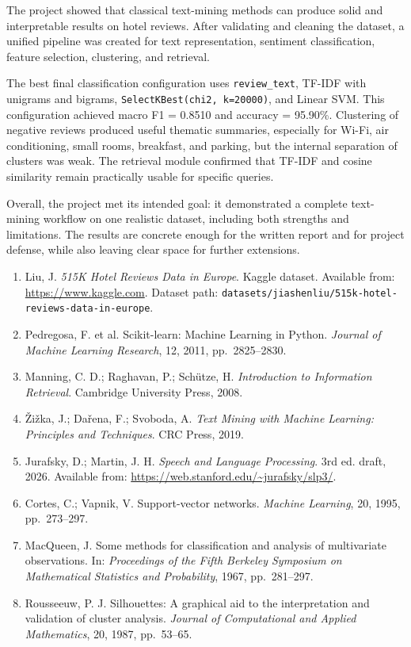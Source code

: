 \documentclass[twoside, 12pt]{article}
\begin{document}
The project showed that classical text-mining methods can produce solid and interpretable results on hotel reviews. After validating and cleaning the dataset, a unified pipeline was created for text representation, sentiment classification, feature selection, clustering, and retrieval.

The best final classification configuration uses \texttt{review\_text}, TF-IDF with unigrams and bigrams, \texttt{SelectKBest(chi2, k=20000)}, and Linear SVM. This configuration achieved macro F1 = 0.8510 and accuracy = 95.90\%. Clustering of negative reviews produced useful thematic summaries, especially for Wi-Fi, air conditioning, small rooms, breakfast, and parking, but the internal separation of clusters was weak. The retrieval module confirmed that TF-IDF and cosine similarity remain practically usable for specific queries.

Overall, the project met its intended goal: it demonstrated a complete text-mining workflow on one realistic dataset, including both strengths and limitations. The results are concrete enough for the written report and for project defense, while also leaving clear space for further extensions.


{\raggedright
\begin{enumerate}
    \item Liu, J. \emph{515K Hotel Reviews Data in Europe}. Kaggle dataset. Available from: \url{https://www.kaggle.com}. Dataset path: \texttt{datasets/jiashenliu/515k-hotel-reviews-data-in-europe}.
    \item Pedregosa, F. et al. Scikit-learn: Machine Learning in Python. \emph{Journal of Machine Learning Research}, 12, 2011, pp.~2825--2830.
    \item Manning, C. D.; Raghavan, P.; Schütze, H. \emph{Introduction to Information Retrieval}. Cambridge University Press, 2008.
    \item Žižka, J.; Dařena, F.; Svoboda, A. \emph{Text Mining with Machine Learning: Principles and Techniques}. CRC Press, 2019.
    \item Jurafsky, D.; Martin, J. H. \emph{Speech and Language Processing}. 3rd ed. draft, 2026. Available from: \url{https://web.stanford.edu/~jurafsky/slp3/}.
    \item Cortes, C.; Vapnik, V. Support-vector networks. \emph{Machine Learning}, 20, 1995, pp.~273--297.
    \item MacQueen, J. Some methods for classification and analysis of multivariate observations. In: \emph{Proceedings of the Fifth Berkeley Symposium on Mathematical Statistics and Probability}, 1967, pp.~281--297.
    \item Rousseeuw, P. J. Silhouettes: A graphical aid to the interpretation and validation of cluster analysis. \emph{Journal of Computational and Applied Mathematics}, 20, 1987, pp.~53--65.
\end{enumerate}
\par}
\end{document}
